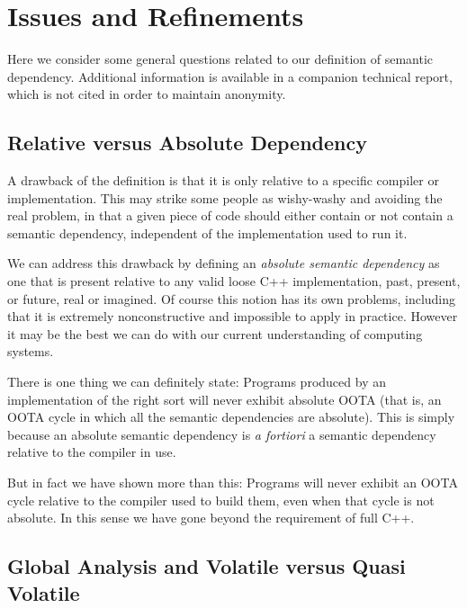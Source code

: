 \section{Issues and Refinements}
\label{sec:Issues and Refinements}

Here we consider some general questions related to our definition of
semantic dependency.
Additional information is available in a companion technical report,
which is not cited in order to maintain anonymity.

\subsection{Relative versus Absolute Dependency}
\label{sec:Relative versus Absolute Dependency}

A drawback of the definition is that it is only relative to a specific
compiler or implementation.
This may strike some people as wishy-washy and avoiding the real
problem, in that a given piece of code should either contain or not
contain a semantic dependency, independent of the implementation used to
run it.

We can address this drawback by defining an \emph{absolute semantic
dependency} as one that is present relative to any valid loose C++
implementation, past, present, or future, real or imagined.
Of course this notion has its own problems, including that it is
extremely nonconstructive and impossible to apply in practice.
However it may be the best we can do with our current understanding
of computing systems.

There is one thing we can definitely state:
Programs produced by an implementation of the right sort will never
exhibit absolute OOTA (that is, an OOTA cycle in which all the
semantic dependencies are absolute).
This is simply because an absolute semantic dependency is {\it
a fortiori\/} a semantic dependency relative to the compiler in use.

But in fact we have shown more than this:
Programs will never exhibit an OOTA cycle relative to the compiler
used to build them, even when that cycle is not absolute.
In this sense we have gone beyond the requirement of full C++.

\subsection{Global Analysis and Volatile versus Quasi Volatile}
\label{sec:Global Analysis and Volatile versus Quasi Volatile}

